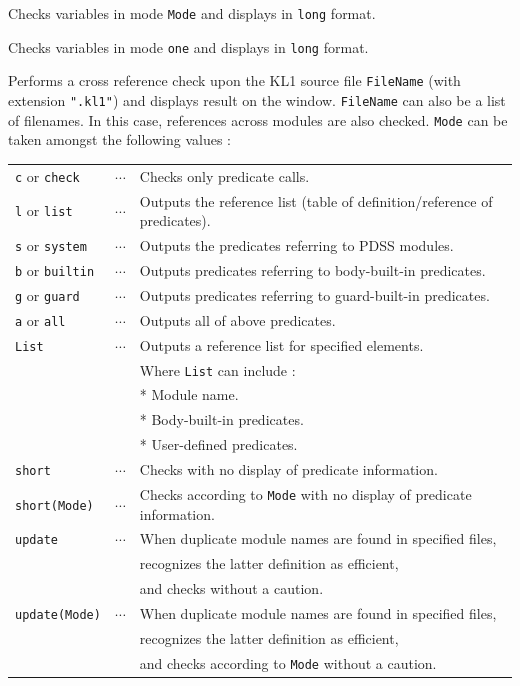 \begin{itemize}
Checks variables in mode \verb|Mode| and displays in \verb|long| format.

Checks variables in mode \verb|one| and displays in \verb|long| format.

Performs a cross reference check upon the KL1 source file \verb|FileName|
 (with extension \verb|".kl1"|) and displays result on the window.
\verb|FileName| can also be a list of filenames. In this case, references 
across modules are also checked. \verb|Mode| can be taken amongst the following
values :

\vspace{1ex}
\hspace*{15mm}\begin{tabular}{lcl}
\verb|c| or \verb|check|       & $\cdots$ & Checks only predicate calls.\\
\verb|l| or \verb|list|        & $\cdots$ 
  & Outputs the reference list (table of definition/reference of predicates).\\
\verb|s| or \verb|system|      & $\cdots$ 
  & Outputs the predicates referring to PDSS modules.\\
\verb|b| or \verb|builtin|     & $\cdots$ 
  & Outputs predicates referring to body-built-in predicates.\\
\verb|g| or \verb|guard|       & $\cdots$
& Outputs predicates referring to guard-built-in predicates.\\
\verb|a| or \verb|all|         & $\cdots$ & Outputs all of above predicates.\\
\verb|List|      & $\cdots$    
  & Outputs a reference list for specified elements.\\
                 &      & Where \verb|List| can include :\\
                 &      & * Module name.\\
                 &      & * Body-built-in predicates.\\
                 &      & * User-defined predicates.\\
\verb|short|    & $\cdots$ & Checks with no display of predicate information.\\
\verb|short(Mode)|      & $\cdots$ 
  & Checks according to \verb|Mode| with no display of predicate information.\\
\verb|update|    & $\cdots$ 
  & When duplicate module names are found in specified files, \\
		&	& recognizes the latter definition as efficient,\\
		&	& and checks without a caution.\\
\verb|update(Mode)| & $\cdots$
  & When duplicate module names are found in specified files, \\
		&	& recognizes the latter definition as efficient,\\
		&	&and checks according to \verb|Mode| without a caution.
\end{tabular}
\vspace{1ex}


\end{itemize}
